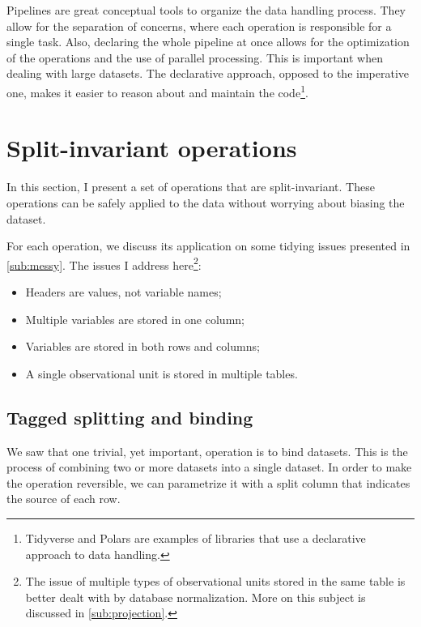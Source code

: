 Pipelines are great conceptual tools to organize the data handling process.  They allow
for the separation of concerns, where each operation is responsible for a single task.
Also, declaring the whole pipeline at once allows for the optimization of the operations
and the use of parallel processing.  This is important when dealing with large datasets.
The declarative approach, opposed to the imperative one, makes it easier to reason about
and maintain the code\footnote{Tidyverse and Polars are examples of
libraries that use a declarative approach to data handling.}.

\section{Split-invariant operations}

In this section, I present a set of operations that are split-invariant.  These operations
can be safely applied to the data without worrying about biasing the dataset.

For each operation, we discuss its application on some tidying issues presented in
\cref{sub:messy}.  The issues I address here\footnote{%
The issue of multiple types of observational units stored in the same table is better
dealt with by database normalization.  More on this subject is discussed in
\cref{sub:projection}.}:
\begin{itemize}
  \itemsep0em
  \item Headers are values, not variable names;
  \item Multiple variables are stored in one column; %
  \item Variables are stored in both rows and columns;
  \item A single observational unit is stored in multiple tables.
\end{itemize}



\subsection{Tagged splitting and binding}

We saw that one trivial, yet important, operation is to bind datasets.  This is the
process of combining two or more datasets into a single dataset.  In order to make the
operation reversible, we can parametrize it with a split column that indicates the source
of each row.

